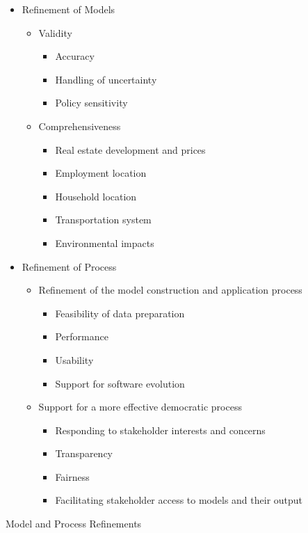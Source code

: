 \begin{table}[t]
\begin{itemize}
\item Refinement of Models
   \begin{itemize}
   \item Validity
      \begin{itemize}
      \item Accuracy
      \item Handling of uncertainty
      \item Policy sensitivity
      \end{itemize}
   \item Comprehensiveness
      \begin{itemize}
      \item Real estate development and prices
      \item Employment location
      \item Household location
      \item Transportation system
      \item Environmental impacts
      \end{itemize}
   \end{itemize}
\item Refinement of Process
   \begin{itemize}
   \item Refinement of the model construction and application process
      \begin{itemize}
      \item Feasibility of data preparation
      \item Performance
      \item Usability
      \item Support for software evolution
      \end{itemize}
   \item Support for a more effective democratic process
      \begin{itemize}
      \item Responding to stakeholder interests and concerns
      \item Transparency
      \item Fairness
      \item Facilitating stakeholder access to models and their output
      \end{itemize}
   \end{itemize}
\end{itemize}

\caption{Model and Process Refinements}
\label{taxonomy-table}
\end{table}

